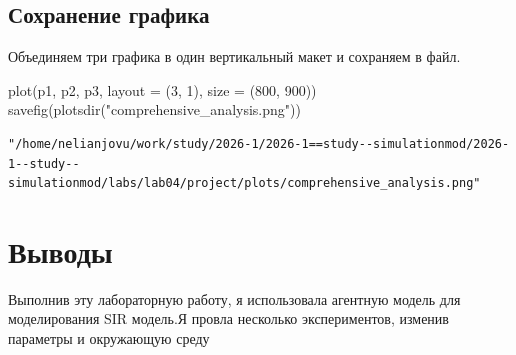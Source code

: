 \documentclass[
  12pt,
  a4paper,
  DIV=11,
  numbers=noendperiod]{scrreprt}
\newenvironment{Shaded}{\begin{snugshade}}{\end{snugshade}}
\newcommand{\FloatTok}[1]{\textcolor[rgb]{0.68,0.00,0.00}{#1}}
\newcommand{\FunctionTok}[1]{\textcolor[rgb]{0.28,0.35,0.67}{#1}}
\newcommand{\NormalTok}[1]{\textcolor[rgb]{0.00,0.23,0.31}{#1}}
\newcommand{\OperatorTok}[1]{\textcolor[rgb]{0.37,0.37,0.37}{#1}}
\newcommand{\StringTok}[1]{\textcolor[rgb]{0.13,0.47,0.30}{#1}}
\begin{document}


\section{Сохранение
графика}\label{ux441ux43eux445ux440ux430ux43dux435ux43dux438ux435-ux433ux440ux430ux444ux438ux43aux430}

Объединяем три графика в один вертикальный макет и сохраняем в файл.

\begin{Shaded}
\begin{Highlighting}[]
\FunctionTok{plot}\NormalTok{(p1, p2, p3, layout }\OperatorTok{=}\NormalTok{ (}\FloatTok{3}\NormalTok{, }\FloatTok{1}\NormalTok{), size }\OperatorTok{=}\NormalTok{ (}\FloatTok{800}\NormalTok{, }\FloatTok{900}\NormalTok{))}
\FunctionTok{savefig}\NormalTok{(}\FunctionTok{plotsdir}\NormalTok{(}\StringTok{"comprehensive\_analysis.png"}\NormalTok{))}
\end{Highlighting}
\end{Shaded}

\begin{verbatim}
"/home/nelianjovu/work/study/2026-1/2026-1==study--simulationmod/2026-1--study--simulationmod/labs/lab04/project/plots/comprehensive_analysis.png"
\end{verbatim}

\chapter{Выводы}\label{ux432ux44bux432ux43eux434ux44b}

Выполнив эту лабораторную работу, я использовала агентную модель для
моделирования SIR модель.Я провла несколько экспериментов, изменив
параметры и окружающую среду


\printbibliography
\end{document}
